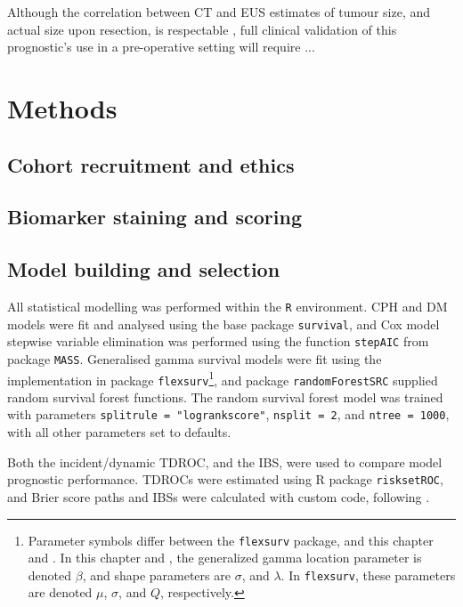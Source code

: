 \documentclass[dissertation.tex]{subfiles}
\begin{document}
Although the correlation between \gls{CT} and \gls{EUS} estimates of tumour size, and actual size upon resection, is respectable \cite{Arvold2011}, full clinical validation of this prognostic's use in a pre-operative setting will require ...

\section{Methods}
\subsection{Cohort recruitment and ethics}
\label{subsec:nomo-methods-cohort}

\subsection{Biomarker staining and scoring}

\subsection{Model building and selection}
All statistical modelling was performed within the \texttt{R} environment.  \gls{CPH} and \gls{DM} models were fit and analysed using the base package \texttt{survival}, and Cox model stepwise variable elimination was performed using the function \texttt{stepAIC} from package \texttt{MASS}.  Generalised gamma survival models were fit using the implementation in package \texttt{flexsurv}\footnote{Parameter symbols differ between the \texttt{flexsurv} package, and this chapter and \cite{Cox2007}.  In this chapter and \cite{Cox2007}, the generalized gamma location parameter is denoted $\beta$, and shape parameters are $\sigma$, and $\lambda$.  In \texttt{flexsurv}, these parameters are denoted $\mu$, $\sigma$, and $Q$, respectively.}, and package \texttt{randomForestSRC} supplied random survival forest functions.  The random survival forest model was trained with parameters \texttt{splitrule = "logrankscore"}, \texttt{nsplit = 2}, and \texttt{ntree = 1000}, with all other parameters set to defaults.

Both the incident/dynamic \gls{TDROC}, and the \gls{IBS}, were used to compare model prognostic performance.  \glspl{TDROC} were estimated using R package \texttt{risksetROC}, and Brier score paths and \glspl{IBS} were calculated with custom code, following \cite{Graf1999}.
\end{document}
